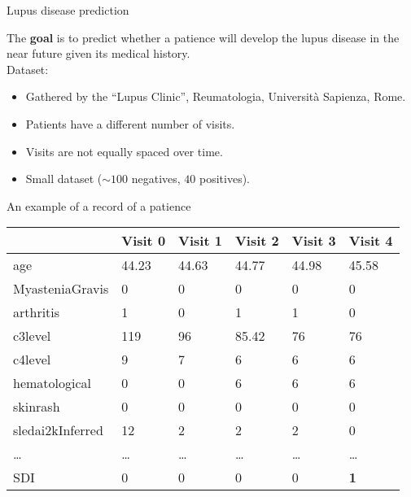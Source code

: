 

\begin{frame}{Lupus disease prediction}

	The \textbf{goal} is to predict whether a patience will develop the lupus disease in the near future given its medical history.
	\vspace{2em}\\
	Dataset:
	\begin{itemize}
		\item Gathered by the ``Lupus Clinic'', Reumatologia, Università Sapienza, Rome.
		\item Patients have a different number of visits.
		\item Visits are not equally spaced over time.
		\item Small dataset ($\sim100$ negatives, $40$ positives).
	\end{itemize}

\end{frame}

\begin{frame}{An example of a record of a patience}
\begin{table}[H]
	\centering
	\begin{tabular}{ C{2.5cm} | C{1cm} C{1cm} C{1cm} C{1cm} C{1cm}}
		& Visit 0 & Visit 1 & Visit 2 & Visit 3 & Visit 4 \\
		\hline
		age & 44.23 & 44.63 & 44.77 & 44.98 & 45.58 \\
		MyasteniaGravis & 0 & 0 & 0 & 0 & 0 \\
		arthritis & 1 & 0 & 1 & 1 & 0 \\
		c3level & 119 & 96 & 85.42 & 76 & 76 \\
		c4level & 9 & 7 & 6 & 6 & 6 \\
		hematological & 0 & 0 & 6 & 6 & 6 \\
		skinrash & 0 & 0 & 0 & 0 & 0 \\
		sledai2kInferred & 12 & 2 & 2 & 2 & 0 \\
		\dots & \dots & \dots & \dots & \dots & \dots \\
		\hline
		SDI & 0 & 0 & 0 & 0 & \textbf{1}\\
	\end{tabular}
\end{table}	
\end{frame}


